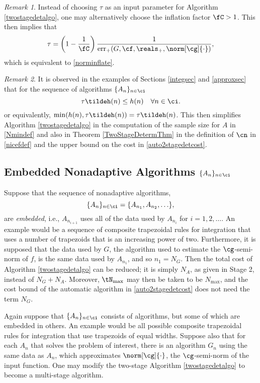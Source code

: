 \documentclass[final]{elsarticle}
\DeclareMathOperator{\err}{err}
\theoremstyle{definition}
\theoremstyle{remark}
\newtheorem{rem}{Remark}
\begin{document}
\begin{rem} Instead of choosing $\tau$ as an input parameter for Algorithm \ref{twostagedetalgo}, one may alternatively choose the inflation factor $\fC >1$.  This then implies that 
\begin{equation} \label{taufromnC}
\tau = \left(1 - \frac{1}{\fC}\right)\frac{1}{\err_{+}(G,\cf,\reals_+,\norm[\cg]{\cdot})},
\end{equation}
which is equivalent to \eqref{norminflate}.
\end{rem}

\begin{rem} It is observed in the examples of Sections \ref{integsec} and \ref{approxsec} that for the sequence of algorithms $\{A_n\}_{n \in \ci}$
\begin{equation}
\tau \tildeh(n) \le h(n) \quad \forall n \in \ci.
\end{equation}
or equivalently, $\min(h(n),\tau \tildeh(n))=\tau\tildeh(n)$.  This then simplifies Algorithm \ref{twostagedetalgo} in the computation of the sample size for $A$ in \eqref{Nmindef} and also in Theorem \ref{TwoStageDetermThm} in the definition of $\cn$ in \eqref{nicefdef} and the upper bound on the cost in \eqref{auto2stagedetcost}. 
\end{rem}


\subsection{Embedded Nonadaptive Algorithms $\{A_n\}_{n \in \ci}$}

Suppose that the sequence of nonadaptive algorithms, 
\[
\{A_n\}_{n \in \ci} = \{A_{n_1}, A_{n_2}, \ldots \}, 
\]
are \emph{embedded}, i.e., $A_{n_{i+1}}$ uses all of the data used by $A_{n_{i}}$ for $i=1, 2, \ldots$.  An example would be a sequence of composite trapezoidal rules for integration that uses a number of trapezoids that is an increasing power of two. Furthermore, it is supposed that the data used by $G$, the algorithm used to estimate the $\cg$-semi-norm of $f$, is the same data used by $A_{n_1}$, and so $n_1=N_G$.  Then the total cost of Algorithm \ref{twostagedetalgo} can be reduced; it is simply $N_A$, as given in Stage 2, instead of $N_G+N_A$.  Moreover, $\tN_{\max}$ may then be taken to be $N_{\max}$, and the cost bound of the automatic algorithm in \eqref{auto2stagedetcost} does not need the term $N_G$.


Again suppose that $\{A_n\}_{n \in \ci}$ consists of algorithms, but some of which are embedded in others.  An example would be all possible composite trapezoidal rules for integration that use trapezoids of equal widths. Suppose also that for each $A_n$ that solves the problem of interest, there is an algorithm $G_n$ using the same data as $A_n$, which approximates $\norm[\cg]{\cdot}$, the $\cg$-semi-norm of the input function.  One may modify the two-stage Algorithm \ref{twostagedetalgo} to become a multi-stage algorithm. 
\end{document}
